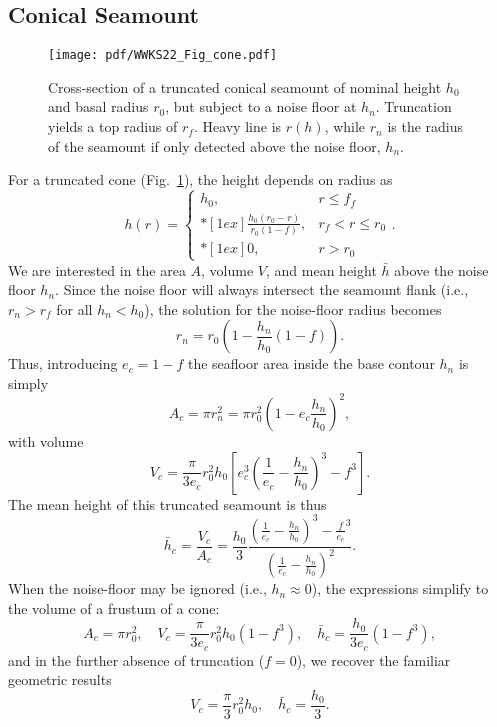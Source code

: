 \subsection{Conical Seamount}

\begin{figure}
\centering
\texttt{[image: pdf/WWKS22\_Fig\_cone.pdf]}
\caption{Cross-section of a truncated conical seamount of nominal height $h_0$ and basal radius $r_0$, but subject
to a noise floor at $h_n$.  Truncation yields a top radius of $r_f$. Heavy line is $r(h)$, while $r_n$ is the
radius of the seamount if only detected above the noise floor, $h_n$.}
\label{WWKS22_Fig_cone}
\end{figure}
For a truncated cone (Fig.~\ref{WWKS22_Fig_cone}), the height depends on radius as
\begin{equation*}
h(r) = \left \{ \begin{array}{cl}
	h_0, &	r \leq f_f \\*[1ex]
	\displaystyle \frac{h_0 (r_0 - r)}{r_0 (1-f)}, & r_f < r \leq r_0 \\*[1ex]
	0, & r > r_0
\end{array} \right..
\end{equation*}
We are interested in the area $A$, volume $V$, and mean height $\bar{h}$ above the noise floor $h_n$.
Since the noise floor will always intersect the seamount flank (i.e., $r_n > r_f$ for all $h_n < h_0$),
the solution for the noise-floor radius becomes
\begin{equation*}
r_n = r_0 \left ( 1 - \frac{h_n}{h_0}(1 - f) \right ).
\end{equation*}
Thus, introducing $e_c = 1 -f$ the seafloor area inside the base contour $h_n$ is simply
\begin{equation}
A_c = \pi r_n^2 = \pi r_0^2 \left ( 1 - e_c\frac{h_n}{h_0} \right )^2,
\end{equation}
with volume
\begin{equation}
V_c = \frac{\pi}{3e_c}r_0^2h_0 \left [ e_c^3 \left (\frac{1}{e_c} - \frac{h_n}{h_0} \right )^3 - f^3 \right ].
\end{equation}
The mean height of this truncated seamount is thus
\begin{equation}
\bar{h}_c =  \frac{V_c}{A_c} = \frac{h_0}{3} \frac{\left (\frac{1}{e_c} - \frac{h_n}{h_0} \right )^3 - \frac{f}{e_c}^3}{\left (\frac{1}{e_c} - \frac{h_n}{h_0} \right)^2}.
\end{equation}
When the noise-floor may be ignored (i.e., $h_n \approx 0$), the expressions simplify to the volume of a frustum of a cone:
\begin{equation*}
A_c = \pi r_0^2,	\quad V_c = \frac{\pi}{3e_c}r_0^2h_0 \left (1 - f^3 \right ), \quad \bar{h}_c =  \frac{h_0}{3e_c}\left (1 - f^3 \right ),
\end{equation*}
and in the further absence of truncation ($f = 0$), we recover the familiar geometric results
\begin{equation*}
V_c = \frac{\pi}{3}r_0^2h_0, \quad \bar{h}_c =  \frac{h_0}{3}.
\end{equation*}

